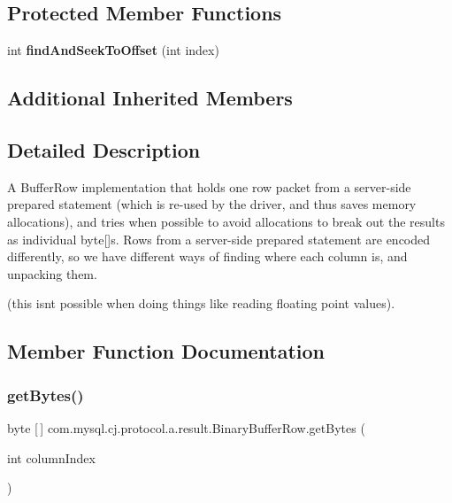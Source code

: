 \subsection*{Protected Member Functions}
\begin{DoxyCompactItemize}
\item 
\mbox{\label{classcom_1_1mysql_1_1cj_1_1protocol_1_1a_1_1result_1_1_binary_buffer_row_a5b8c0028ba6d68556a027d0d6cdf96aa}} 
int {\bfseries find\+And\+Seek\+To\+Offset} (int index)
\end{DoxyCompactItemize}
\subsection*{Additional Inherited Members}


\subsection{Detailed Description}
A Buffer\+Row implementation that holds one row packet from a server-\/side prepared statement (which is re-\/used by the driver, and thus saves memory allocations), and tries when possible to avoid allocations to break out the results as individual byte\mbox{[}\mbox{]}s. Rows from a server-\/side prepared statement are encoded differently, so we have different ways of finding where each column is, and unpacking them.

(this isn\textquotesingle{}t possible when doing things like reading floating point values). 

\subsection{Member Function Documentation}
\mbox{\label{classcom_1_1mysql_1_1cj_1_1protocol_1_1a_1_1result_1_1_binary_buffer_row_a2d51fe0441a52cbc0d93b23a5c1c0364}} 
\subsubsection{\texorpdfstring{get\+Bytes()}{getBytes()}}
{\footnotesize\ttfamily byte \mbox{[}$\,$\mbox{]} com.\+mysql.\+cj.\+protocol.\+a.\+result.\+Binary\+Buffer\+Row.\+get\+Bytes (\begin{DoxyParamCaption}\item[{int}]{column\+Index }\end{DoxyParamCaption})}

